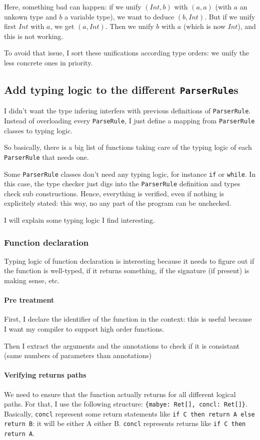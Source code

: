 \documentclass{article}
\newcommand\cc[1]{\lstinline{#1}}
\begin{document}
				Here, something bad can happen: if we unify $(Int, b)$ with $(a, a)$ (with $a$ an unkown type and $b$ a variable type), we want to deduce $(b, Int)$. But if we unify first $Int$ with $a$, we get $(a, Int)$. Then we unify $b$ with $a$ (which is now $Int$), and this is not working.

				To avoid that issue, I sort these unifications according type orders: we unify the less concrete ones in priority.

	\subsection{Add typing logic to the different \cc{ParserRule}s}
		I didn't want the type infering interfers with previous definitions of \cc{ParserRule}. Instead of overloading every \cc{ParseRule}, I just define a mapping from \cc{ParserRule} classes to typing logic.

		So basically, there is a big list of functions taking care of the typing logic of each \cc{ParserRule} that needs one.

		Some \cc{ParserRule} classes don't need any typing logic, for instance \cc{if} or \cc{while}. In this case, the type checker just digs into the \cc{ParserRule} definition and types check sub constructions. Hence, everything is verified, even if nothing is explicitely stated: this way, no any part of the program can be unchecked.


		I will explain some typing logic I find interesting.
		\subsubsection{Function declaration}
			Typing logic of function declaration is interesting because it needs to figure out if the function is well-typed, if it returns something, if the signature (if present) is making sense, etc.

			\paragraph{Pre treatment}
			First, I declare the identifier of the function in the context: this is useful because I want my compiler to support high order functions.

			Then I extract the arguments and the annotations to check if it is consistant (same numbers of parameters than annotations)

			\paragraph{Verifying returns paths}
				We need to ensure that the function actually returns for all different logical paths. For that, I use the following structure: \texttt{\{mabye: Ret[], concl: Ret[]\}}. Basically, \texttt{concl} represent some return statements like \texttt{if C then return A else return B}: it will be either A either B.  \texttt{concl} represents returns like \texttt{if C then return A}.
\end{document}
